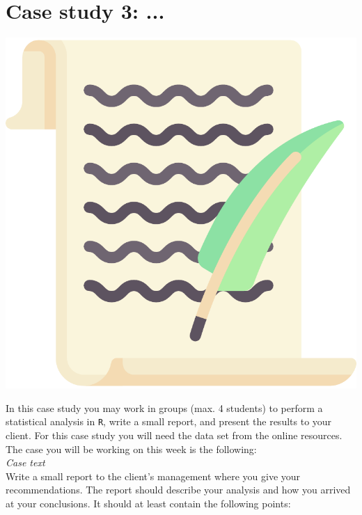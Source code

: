 
\begin{minipage}{0.8\textwidth}
\section{Case study 3: ...}
\end{minipage}%
\hfill%
\begin{minipage}{0.1\textwidth}
\includegraphics[width=\linewidth]{Files/Images/lettericon.pdf}
\end{minipage}
\vspace*{.1cm}

In this case study you may work in groups (max. 4 students) to perform a statistical analysis in \texttt{R}, write a small report, and present the results to your client. For this case study you will need the data set  from the online resources. The case you will be working on this week is the following: \\

\textit{Case text} \\

Write a small report to the client's management where you give your recommendations. The report should describe your analysis and how you arrived at your conclusions. It should at least contain the following points: \\

